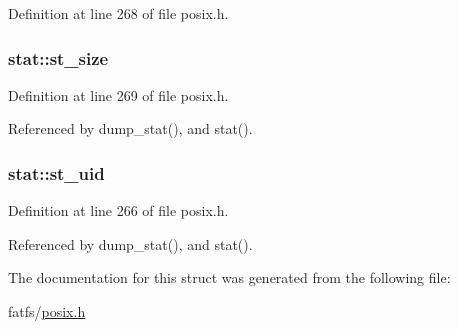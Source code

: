 Definition at line 268 of file posix.\-h.

\hypertarget{structstat_a040e19c8b9766f841fde8786ce9297bf}{
\subsubsection[{st\-\_\-size}]{ stat\-::st\-\_\-size}}\label{structstat_a040e19c8b9766f841fde8786ce9297bf}


Definition at line 269 of file posix.\-h.



Referenced by dump\-\_\-stat(), and stat().

\hypertarget{structstat_a4a8708a3d18be60ee7b2f06c4cab0c70}{
\subsubsection[{st\-\_\-uid}]{ stat\-::st\-\_\-uid}}\label{structstat_a4a8708a3d18be60ee7b2f06c4cab0c70}


Definition at line 266 of file posix.\-h.



Referenced by dump\-\_\-stat(), and stat().



The documentation for this struct was generated from the following file\-:\begin{DoxyCompactItemize}
\item 
fatfs/\hyperlink{posix_8h}{posix.\-h}\end{DoxyCompactItemize}

